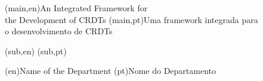 
%




%
%
%
%
\nttitle(main,en){An Integrated Framework for\\the Development of CRDTs}%
\nttitle(main,pt){Uma framework integrada para\\o desenvolvimento de CRDTs}%

\nttitle(sub,en){}%
\nttitle(sub,pt){}%



%
%
%
%
\ntdepartment(en){Name of the Department} %
\ntdepartment(pt){Nome do Departamento}   %




